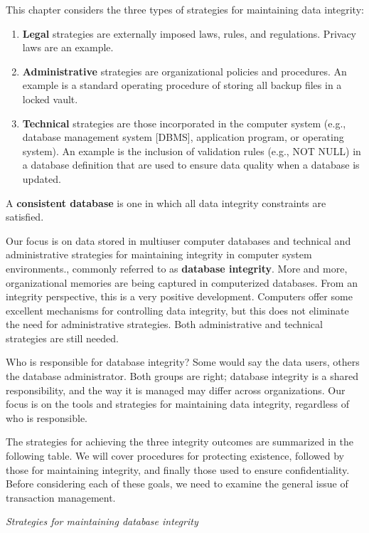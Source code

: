 \documentclass[
]{article}
\begin{document}
This chapter considers the three types of strategies for maintaining
data integrity:

\begin{enumerate}
\def\labelenumi{\arabic{enumi}.}
\item
  \textbf{Legal} strategies are externally imposed laws, rules, and
  regulations. Privacy laws are an example.
\item
  \textbf{Administrative} strategies are organizational policies and
  procedures. An example is a standard operating procedure of storing
  all backup files in a locked vault.
\item
  \textbf{Technical} strategies are those incorporated in the computer
  system (e.g., database management system {[}DBMS{]}, application
  program, or operating system). An example is the inclusion of
  validation rules (e.g., NOT NULL) in a database definition that are
  used to ensure data quality when a database is updated.
\end{enumerate}

A \textbf{consistent database} is one in which all data integrity constraints
are satisfied.

Our focus is on data stored in multiuser computer databases and
technical and administrative strategies for maintaining integrity in
computer system environments., commonly referred to as \textbf{database
integrity}. More and more, organizational memories are being captured
in computerized databases. From an integrity perspective, this is a very
positive development. Computers offer some excellent mechanisms for
controlling data integrity, but this does not eliminate the need for
administrative strategies. Both administrative and technical strategies
are still needed.

Who is responsible for database integrity? Some would say the data
users, others the database administrator. Both groups are right;
database integrity is a shared responsibility, and the way it is managed
may differ across organizations. Our focus is on the tools and
strategies for maintaining data integrity, regardless of who is
responsible.

The strategies for achieving the three integrity outcomes are summarized
in the following table. We will cover procedures for protecting
existence, followed by those for maintaining integrity, and finally
those used to ensure confidentiality. Before considering each of these
goals, we need to examine the general issue of transaction management.

\emph{Strategies for maintaining database integrity}
\end{document}
